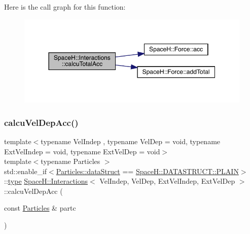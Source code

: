 Here is the call graph for this function\+:
\nopagebreak
\begin{figure}[H]
\begin{center}
\leavevmode
\includegraphics[width=350pt]{class_space_h_1_1_interactions_a03e732beb7595072c5861434cec1f24f_cgraph}
\end{center}
\end{figure}
\mbox{\label{class_space_h_1_1_interactions_abe696c7b0b263c1f86af6e2b131777fc}} 
\subsubsection{\texorpdfstring{calcu\+Vel\+Dep\+Acc()}{calcuVelDepAcc()}\hspace{0.1cm}{\footnotesize\ttfamily [1/2]}}
{\footnotesize\ttfamily template$<$typename Vel\+Indep , typename Vel\+Dep  = void, typename Ext\+Vel\+Indep  = void, typename Ext\+Vel\+Dep  = void$>$ \\
template$<$typename Particles $>$ \\
std\+::enable\+\_\+if$<$\mbox{\hyperlink{class_space_h_1_1_vel_indep_particles_a066cbb08e0d444c27e2f71c30092e13f}{Particles\+::data\+Struct}} == \mbox{\hyperlink{namespace_space_h_a4782f089179a3c269891f02482b072dfaf62eb0bf5e5c72e80983fbbac1cb70e5}{Space\+H\+::\+D\+A\+T\+A\+S\+T\+R\+U\+C\+T\+::\+P\+L\+A\+IN}}$>$\+::\mbox{\hyperlink{class_space_h_1_1_interactions_aa45fc9367bfa0b8693700525ffa2655f}{type}} \mbox{\hyperlink{class_space_h_1_1_interactions}{Space\+H\+::\+Interactions}}$<$ Vel\+Indep, Vel\+Dep, Ext\+Vel\+Indep, Ext\+Vel\+Dep $>$\+::calcu\+Vel\+Dep\+Acc (\begin{DoxyParamCaption}\item[{const \mbox{\hyperlink{struct_space_h_1_1_particles}{Particles}} \&}]{partc }\end{DoxyParamCaption})\hspace{0.3cm}{\ttfamily [inline]}}

